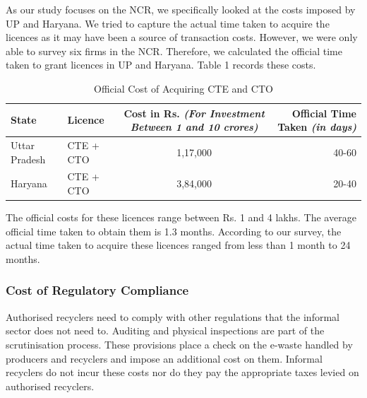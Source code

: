 \documentclass[a4paper, 12pt]{article}
\begin{document}
                    As our study focuses on the NCR, we specifically looked at the costs imposed by UP and Haryana. We tried to capture the actual time taken to acquire the licences as it may have been a source of transaction costs. However, we were only able to survey six firms in the NCR. Therefore, we calculated the official time taken to grant licences in UP and Haryana. Table 1 records these costs. \\
          
\begin{table}[htpb]
\caption{Official Cost of Acquiring CTE and CTO}
\begin{tabular}{ l  l  c  r } %
\toprule
 \multicolumn{1}{p{7em}}{State} & \multicolumn{1}{p{7em}}{Licence} & \multicolumn{1}{p{11.5em}}{Cost in Rs. \centering\footnotesize\textit{(For Investment Between 1 and 10 crores)}} & \multicolumn{1}{p{8.75em}}{{Official Time Taken} \raggedleft\footnotesize\textit{(in days)}}\\ 

\midrule
Uttar Pradesh & CTE + CTO & 1,17,000 & 40-60\\
Haryana & CTE + CTO & 3,84,000 & 20-40\\
\bottomrule
\end{tabular}
\end{table}
                    
                    The official costs for these licences range between Rs. 1 and 4 lakhs. The average official time taken to obtain them is 1.3 months. According to our survey, the actual time taken to acquire these licences ranged from less than 1 month to 24 months.

\subsubsection{Cost of Regulatory Compliance}
                    
                    Authorised recyclers need to comply with other regulations that the informal sector does not need to. Auditing and physical inspections are part of the scrutinisation process. These provisions place a check on the e-waste handled by producers and recyclers and impose an additional cost on them. Informal recyclers do not incur these costs nor do they pay the appropriate taxes levied on authorised recyclers. \\
                    
\end{document}
